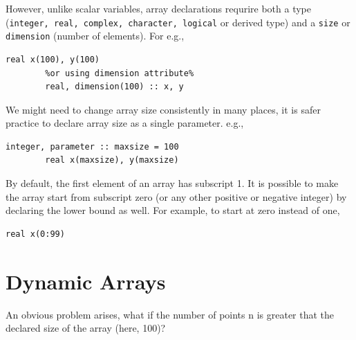 \documentclass[12pt,oneside]{book}
\newcommand{\code}[1]{\lstinline[keywordstyle=\color{black},basicstyle=\ttfamily]{#1}}
\begin{document}
    However, unlike scalar variables, array declarations requrire both a type (\code{integer, real, complex, character, logical} or derived type) and a \code{size} or \code{dimension} (number of elements). For e.g.,
    \begin{lstlisting}[numbers=none,escapechar=\%]
        real x(100), y(100)
        %or using dimension attribute%
        real, dimension(100) :: x, y
    \end{lstlisting}
    We might need to change array size consistently in many places, it is safer practice to declare array size as a single parameter. e.g.,
    \begin{lstlisting}[numbers=none]
        integer, parameter :: maxsize = 100
        real x(maxsize), y(maxsize)
    \end{lstlisting}
    By default, the first element of an array has subscript 1. It is possible to make the array start from subscript zero (or any other positive or negative integer) by declaring the lower bound as well. For example, to start at zero instead of one,
    \begin{lstlisting}[numbers=none]
        real x(0:99)
    \end{lstlisting}
    \section{Dynamic Arrays}
    An obvious problem arises, what if the number of points n is greater that the declared size of the array (here, 100)?
\end{document}
